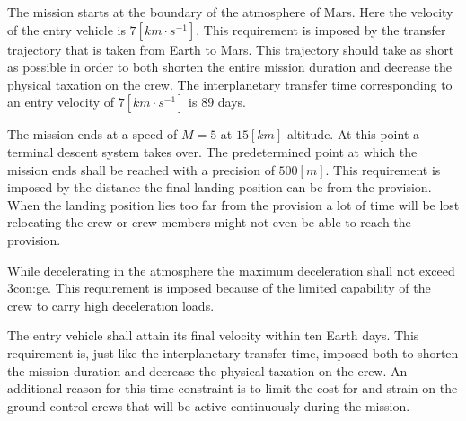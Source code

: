 The mission starts at the boundary of the atmosphere of Mars. Here the velocity of the entry vehicle is $7 \left[km \cdot s^{-1} \right]$. This requirement is imposed by the transfer trajectory that is taken from Earth to Mars. This trajectory should take as short as possible in order to both shorten the entire mission duration and decrease the physical taxation on the crew. The interplanetary transfer time corresponding to an entry velocity of $7 \left[km \cdot s^{-1} \right]$ is $89$ days. 

The mission ends at a speed of $M=5$ at $15 \left[km\right]$ altitude. At this point a terminal descent system takes over. The predetermined point at which the mission ends shall be reached with a precision of $500 \left[m\right]$. This requirement is imposed by the distance the final landing position can be from the provision. When the landing position lies too far from the provision a lot of time will be lost relocating the crew or crew members might not even be able to reach the provision.

While decelerating in the atmosphere the maximum deceleration shall not exceed 3\gls{con:ge}. This requirement is imposed because of the limited capability of the crew to carry high deceleration loads.

The entry vehicle shall attain its final velocity within ten Earth days. This requirement is, just like the interplanetary transfer time, imposed both to shorten the mission duration and decrease the physical taxation on the crew. An additional reason for this time constraint is to limit the cost for and strain on the ground control crews that will be active continuously during the mission.